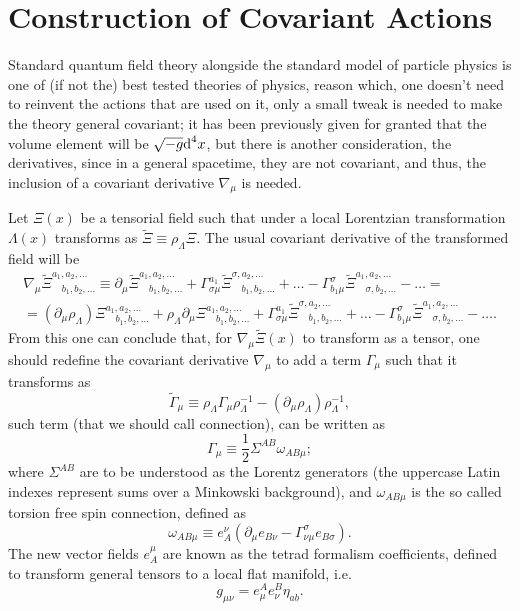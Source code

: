 \section{Construction of Covariant Actions}
Standard quantum field theory alongside the standard model of particle physics is one of (if not the) best tested theories of physics, reason which, one doesn't need to reinvent the actions that are used on it, only a small tweak is needed to make the theory general covariant; it has been previously given for granted that the  volume element will be $\sqrt{-g}\text{d}^4x$, but there is another consideration, the derivatives, since in a general spacetime, they are not covariant, and thus, the inclusion of a covariant derivative $\nabla_\mu$ is needed.

Let $\Xi(x)$ be a tensorial field such that under a local Lorentzian transformation $\Lambda(x)$ transforms as $\tilde{\Xi}\equiv\rho_\Lambda\Xi$. The usual covariant derivative of the transformed field will be
\begin{multline}\label{eq: covariant derivative general}
	\nabla_\mu\tilde\Xi^{a_1,a_2,\hdots}_{\quad b_1,b_2,\hdots}\equiv \partial_\mu\tilde{\Xi}^{a_1,a_2,\hdots}_{\quad b_1,b_2,\hdots}+\Gamma^{a_1}_{\sigma\mu}\tilde\Xi^{\sigma,a_2,\hdots}_{\quad b_1,b_2,\hdots}+\hdots-\Gamma^{\sigma}_{b_1\mu}\tilde\Xi^{a_1,a_2,\hdots}_{\quad \sigma,b_2,\hdots}-\hdots=\\
	=\left(\partial_\mu\rho_\Lambda\right)\Xi^{a_1,a_2,\hdots}_{\quad b_1,b_2,\hdots}+\rho_\Lambda\partial_\mu\Xi^{a_1,a_2,\hdots}_{\quad b_1,b_2,\hdots}+\Gamma^{a_1}_{\sigma\mu}\tilde\Xi^{\sigma,a_2,\hdots}_{\quad b_1,b_2,\hdots}+\hdots-\Gamma^{\sigma}_{b_1\mu}\tilde\Xi^{a_1,a_2,\hdots}_{\quad \sigma,b_2,\hdots}-\hdots.
\end{multline}
From this one can conclude that, for $\nabla_\mu\tilde{\Xi}(x)$ to transform as a tensor, one should redefine the covariant derivative $\nabla_\mu$ to add a term $\Gamma_\mu$ such that it transforms as
\begin{equation}\label{eq: connection transformation rule}
	\tilde{\Gamma}_\mu\equiv \rho_\Lambda\Gamma_\mu\rho_\Lambda^{-1}-\left(\partial_\mu\rho_\Lambda\right)\rho_\Lambda^{-1},
\end{equation}
such term (that we should call connection), can be written as
\begin{equation}\label{eq: connection}
	\Gamma_\mu\equiv \frac{1}{2}\Sigma^{AB}\omega_{AB\mu};
\end{equation}
where $\Sigma^{AB}$ are to be understood as the Lorentz generators (the uppercase Latin indexes represent sums over a Minkowski background), and $\omega_{AB\mu}$ is the so called torsion free spin connection, defined as
\begin{equation}
	\omega_{AB\mu}\equiv e^\nu_A\left(\partial_\mu e_{B\nu}-\Gamma^\sigma_{\nu\mu}e_{B\sigma}\right).
\end{equation}
The new vector fields $e^\mu_A$ are known as the tetrad formalism coefficients, defined to transform general tensors to a local flat manifold, i.e.
\begin{equation}
	g_{\mu\nu}=e^A_\mu e^B_\nu \eta_{ab}.
\end{equation}

